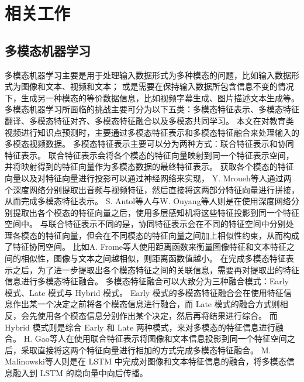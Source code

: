 \chapter{相关工作}

\section{多模态机器学习}
    多模态机器学习主要是用于处理输入数据形式为多种模态的问题，比如输入数据形式为图像和文本\cite{Frome2013DeViSEAD}、视频和文本\cite{Xu2015JointlyMD, Bojanowski2015WeaklySupervisedAO}；
    或是需要在保持输入数据所包含信息不变的情况下，生成另一种模态的等价数据信息，比如视频字幕生成\cite{Austin2017TranslatingVT}、图片描述文本生成\cite{Mao2015DeepCW}等。
    多模态机器学习所面临的挑战主要可分为以下五类\cite{Baltruaitis2019MultimodalML}：多模态特征表示、多模态特征翻译、多模态特征对齐、多模态特征融合以及多模态共同学习。
    本文在对教育类视频进行知识点预测时，主要通过多模态特征表示和多模态特征融合来处理输入的多模态视频数据。
    多模态特征表示主要可以分为两种方式：联合特征表示和协同特征表示。
    联合特征表示会将各个模态的特征向量映射到同一个特征表示空间，并将映射得到的特征向量作为多模态数据的最终特征表示。
    获取各个模态的特征向量以及对特征向量进行投影可以通过神经网络来实现，
    Y. Mroueh等人\cite{Mroueh2015DeepML}通过两个深度网络分别提取出音频与视频特征，然后直接将这两部分特征向量进行拼接，从而完成多模态特征表示。
    S. Antol等人\cite{Agrawal2015VQAVQ}与W. Ouyang等人\cite{Ouyang2014MultisourceDL}则是在使用深度网络分别提取出各个模态的特征向量之后，使用多层感知机将这些特征投影到同一个特征空间中。
    与联合特征表示不同的是，协同特征表示会在不同的特征空间中分别处理各模态的特征向量，但会在不同模态的特征向量之间加上相似性约束，从而构成了特征协同空间。
    比如A. Frome等人\cite{Frome2013DeViSEAD}使用距离函数来衡量图像特征和文本特征之间的相似性，图像与文本之间越相似，则距离函数值越小。
    在完成多模态特征表示之后，为了进一步提取出各个模态特征之间的关联信息，需要再对提取出的特征信息进行多模态特征融合。
    多模态特征融合可以大致分为三种融合模式：Early 模式、Late 模式与 Hybrid 模式。
    Early 模式的多模态特征融合会在使用特征信息作出某一个决定之前将各个模态信息进行融合，而 Late 模式的融合方式则相反，会先使用各个模态信息分别作出某个决定，然后再将结果进行综合。
    而 Hybrid 模式则是综合 Early 和 Late 两种模式，来对多模态的特征信息进行融合。
    H. Gao等人\cite{Gao2015AreYT}在使用联合特征表示将图像和文本信息投影到同一个特征空间之后，采取直接将这两个特征向量进行相加的方式完成多模态特征融合。
    M. Malinowski等人\cite{Malinowski2015AskYN}则是在 LSTM 中完成对图像和文本特征信息的融合，将多模态信息融入到 LSTM 的隐向量中向后传播。


